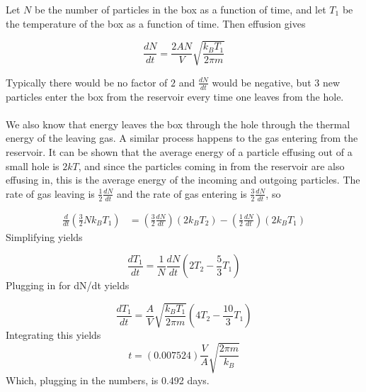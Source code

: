 \begin{solution}
Let $N$ be the number of particles in the box as a function of time, and let $T_1$ be the temperature of the box as a function of time. Then effusion gives

\begin{equation}
    \frac{dN}{dt}=\frac{2AN}{V}\sqrt{\frac{k_BT_1}{2\pi m}}
\end{equation}

Typically there would be no factor of $2$ and $\frac{dN}{dt}$ would be negative, but $3$ new particles enter the box from the reservoir every time one leaves from the hole. \\
\\
We also know that energy leaves the box through the hole through the thermal energy of the leaving gas. A similar process happens to the gas entering from the reservoir. It can be shown that the average energy of a particle effusing out of a small hole is $2kT$, and since the particles coming in from the reservoir are also effusing in, this is the average energy of the incoming and outgoing particles. The rate of gas leaving is $\frac{1}{2}\frac{dN}{dt}$ and the rate of gas entering is $\frac{3}{2}\frac{dN}{dt}$, so

\begin{align}
    \frac{d}{dt}\left(\frac{3}{2}Nk_BT_1\right)&=\left(\frac{3}{2}\frac{dN}{dt}\right)(2k_BT_2)-\left(\frac{1}{2}\frac{dN}{dt}\right)(2k_BT_1)
\end{align}
    Simplifying yields 

    \begin{equation}
        \frac{dT_1}{dt}=\frac{1}{N}\frac{dN}{dt}\left(2T_2-
        \frac{5}{3}T_1\right)
    \end{equation}
    Plugging in for dN/dt yields

    \begin{equation}
        \frac{dT_1}{dt}=\frac{A}{V}\sqrt{\frac{k_BT_1}{2\pi m}}\left(4T_2-\frac{10}{3}T_1\right)
    \end{equation}
    Integrating this yields
    \begin{equation}
        t=(0.007524)\frac{V}{A}\sqrt{\frac{2\pi m}{k_B}}
    \end{equation}
    Which, plugging in the numbers, is 0.492 days. 
    
\end{solution}